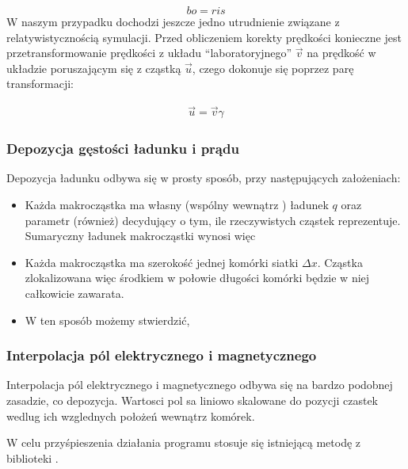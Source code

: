     \begin{equation}
        bo = ris
        \label{eqn:boris-pusher}
    \end{equation}
    W naszym przypadku dochodzi jeszcze jedno utrudnienie związane z relatywistycznością symulacji. 
    Przed obliczeniem korekty prędkości konieczne jest przetransformowanie prędkości z układu ``laboratoryjnego'' $\vec{v}$
    na prędkość w układzie poruszającym się z cząstką $\vec{u}$, czego dokonuje się poprzez parę transformacji:

    \begin{align}
        \vec{u} = \vec{v} \gamma
        \label{eqn:gamma-transformation}
    \end{align}
    \subsubsection{Depozycja gęstości ładunku i prądu} 
    Depozycja ładunku odbywa się w prosty sposób, przy następujących założeniach:
    \begin{itemize}
        \item Każda makrocząstka ma własny (wspólny wewnątrz ) ładunek $q$ oraz parametr  (również) 
            decydujący o tym, ile rzeczywistych cząstek reprezentuje. Sumaryczny ładunek makrocząstki wynosi więc 
        \item Każda makrocząstka ma szerokość jednej komórki siatki $\Delta x$. Cząstka zlokalizowana więc środkiem
            w połowie długości komórki będzie w niej całkowicie zawarata.
        \item W ten sposób możemy stwierdzić, 
    \end{itemize}
    \subsubsection{Interpolacja pól elektrycznego i magnetycznego}
    Interpolacja pól elektrycznego i magnetycznego odbywa się na bardzo podobnej zasadzie, co depozycja.
    Wartosci pol sa liniowo skalowane do pozycji czastek wedlug ich wzglednych położeń wewnątrz komórek.

    W celu przyśpieszenia działania programu stosuje się istniejącą metodę
     z biblioteki . 

